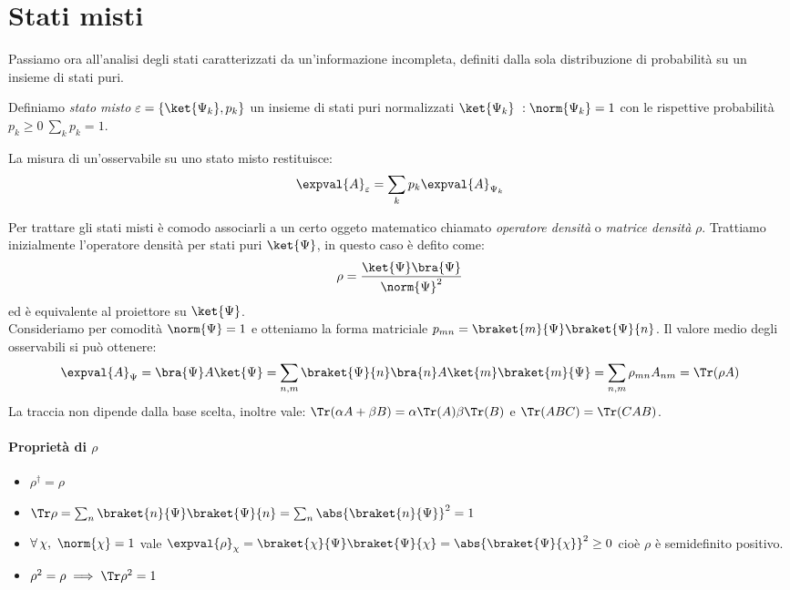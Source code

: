 
\section{Stati misti}
\label{sec: mat_dens}

Passiamo ora all'analisi degli stati caratterizzati da un'informazione incompleta, definiti dalla sola distribuzione di probabilità su un insieme di stati puri.

\begin{definition}
    Definiamo \textit{stato misto} \(\varepsilon = \left\{ \ket{\Psi_k}, p_k \right\}\) un insieme di stati puri normalizzati \(\ket{\Psi_k}\ : \norm{\Psi_k} = 1\) con le rispettive probabilità \(p_k \geq 0 \ \sum_k p_k = 1\).
\end{definition}

La misura di un'osservabile su uno stato misto restituisce:
\begin{equation}
    \expval{A}_\varepsilon = \sum_k p_k \expval{A}_{\Psi_k}
\end{equation}

Per trattare gli stati misti è comodo associarli a un certo oggeto matematico chiamato \textit{operatore densità} o \textit{matrice densità} \(\rho\).
Trattiamo inizialmente l'operatore densità per stati puri \(\ket{\Psi}\), in questo caso è defito come:
\begin{equation}
    \rho = \frac{\ket{\Psi}\bra{\Psi}}{\norm{\Psi}^2}
\end{equation}
ed è equivalente al proiettore su \(\ket{\Psi}\).\\ Consideriamo per comodità \(\norm{\Psi}= 1\) e otteniamo la forma matriciale \(p_{mn} = \braket{m}{\Psi}\braket{\Psi}{n}\). 
Il valore medio degli osservabili si può ottenere:
\begin{equation}
    \expval{A}_\Psi = \bra{\Psi}A\ket{\Psi}= \sum_{n,m} \braket{\Psi}{n}\bra{n}A\ket{m}\braket{m}{\Psi} = \sum_{n,m} \rho_{mn}A_{nm} = \Tr(\rho A)
\end{equation}
La traccia non dipende dalla base scelta, inoltre vale: \(\Tr(\alpha A + \beta B )= \alpha \Tr(A) \beta \Tr(B )\) e \(\Tr(ABC)= \Tr(CAB)\).

\paragraph{Proprietà di \(\rho\)}
\begin{itemize}
    \item \(\rho^\dagger = \rho\)
    \item \(\Tr \rho = \sum_n \braket{n}{\Psi}\braket{\Psi}{n}= \sum_n \abs{\braket{n}{\Psi}}^2 = 1\)
    \item \(\forall\,\chi ,\ \norm{\chi} = 1\) vale \(\expval{\rho}_\chi = \braket{\chi}{\Psi}\braket{\Psi}{\chi}= \abs{\braket{\Psi}{\chi}}^2 \geq 0\) cioè \(\rho\) è semidefinito positivo.
    \item \(\rho^2 = \rho \implies \Tr \rho^2 = 1\)
\end{itemize}

